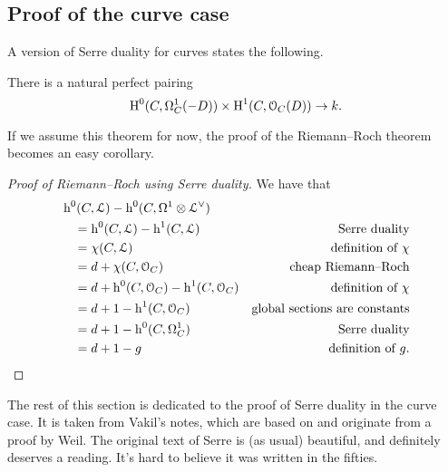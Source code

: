 \documentclass[10pt,a4paper]{article}
\begin{document}
\subsection{Proof of the curve case}
\label{subsection:serre-duality-curves}
A version of Serre duality for curves states the following.
\begin{theorem}
  \label{theorem:serre-duality-curves}
  There is a natural perfect pairing
  \begin{equation}
    \operatorname{H}^0(C,\Omega_C^1(-D))\times\operatorname{H}^1(C,\mathcal{O}_C(D))\to k.
  \end{equation}
\end{theorem}
If we assume this theorem for now, the proof of the Riemann--Roch theorem becomes an easy corollary.
\begin{proof}[Proof of Riemann--Roch using Serre duality]
  We have that
  \begin{equation}
    \begin{aligned}
      &\operatorname{h}^0(C,\mathcal{L})-\operatorname{h}^0(C,\Omega^1\otimes\mathcal{L}^\vee) \\
      &\quad=\operatorname{h}^0(C,\mathcal{L})-\operatorname{h}^1(C,\mathcal{L}) & \text{Serre duality} \\
      &\quad=\chi(C,\mathcal{L}) & \text{definition of~$\chi$} \\
      &\quad=d+\chi(C,\mathcal{O}_C) & \text{cheap Riemann--Roch} \\
      &\quad=d+\operatorname{h}^0(C,\mathcal{O}_C)-\operatorname{h}^1(C,\mathcal{O}_C) & \text{definition of~$\chi$} \\
      &\quad=d+1-\operatorname{h}^1(C,\mathcal{O}_C) & \text{global sections are constants} \\
      &\quad=d+1-\operatorname{h}^0(C,\Omega_C^1) & \text{Serre duality} \\
      &\quad=d+1-g & \text{definition of $g$}.
    \end{aligned}
  \end{equation}
\end{proof}

The rest of this section is dedicated to the proof of Serre duality in the curve case. It is taken from Vakil's notes, which are based on \cite[\S 2]{serre-groupes-algebriques-et-corps-de-classes} and originate from a proof by Weil. The original text of Serre is (as usual) beautiful, and definitely deserves a reading. It's hard to believe it was written in the fifties.
\end{document}
